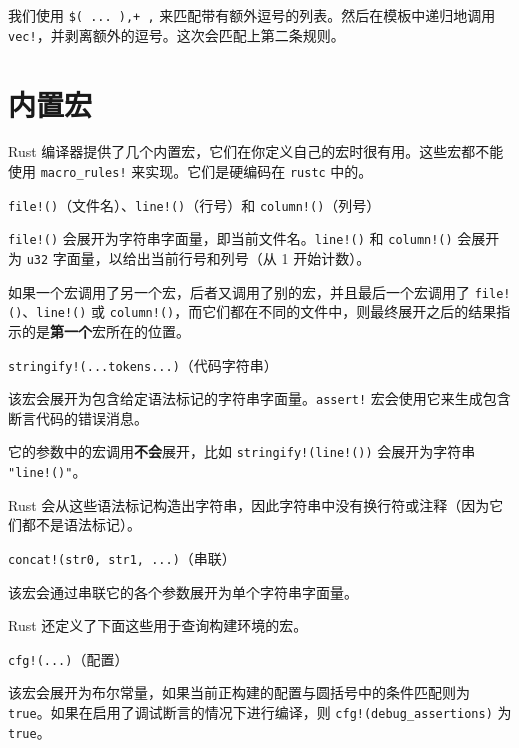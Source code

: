 我们使用 \texttt{\$( ... ),+ ,} 来匹配带有额外逗号的列表。然后在模板中递归地调用 \texttt{vec!}，并剥离额外的逗号。这次会匹配上第二条规则。

\section{内置宏}

Rust 编译器提供了几个内置宏，它们在你定义自己的宏时很有用。这些宏都不能使用 \texttt{macro\_rules!} 来实现。它们是硬编码在 \texttt{rustc} 中的。

\begin{myNote}
\texttt{file!()}（文件名）、\texttt{line!()}（行号）和 \texttt{column!()}（列号）
\end{myNote}

\texttt{file!()} 会展开为字符串字面量，即当前文件名。\texttt{line!()} 和 \texttt{column!()} 会展开为 \texttt{u32} 字面量，以给出当前行号和列号（从 1 开始计数）。

如果一个宏调用了另一个宏，后者又调用了别的宏，并且最后一个宏调用了 \texttt{file!()}、\texttt{line!()} 或 \texttt{column!()}，而它们都在不同的文件中，则最终展开之后的结果指示的是\textbf{第一个}宏所在的位置。

\begin{myNote}
\texttt{stringify!(...tokens...)}（代码字符串）
\end{myNote}

该宏会展开为包含给定语法标记的字符串字面量。\texttt{assert!} 宏会使用它来生成包含断言代码的错误消息。

它的参数中的宏调用\textbf{不会}展开，比如 \texttt{stringify!(line!())} 会展开为字符串 \texttt{"line!()"}。

Rust 会从这些语法标记构造出字符串，因此字符串中没有换行符或注释（因为它们都不是语法标记）。

\begin{mySidenote}
\texttt{concat!(str0, str1, ...)}（串联）
\end{mySidenote}

该宏会通过串联它的各个参数展开为单个字符串字面量。

Rust 还定义了下面这些用于查询构建环境的宏。

\begin{mySidenote}
\texttt{cfg!(...)}（配置）
\end{mySidenote}

该宏会展开为布尔常量，如果当前正构建的配置与圆括号中的条件匹配则为 \texttt{true}。如果在启用了调试断言的情况下进行编译，则 \texttt{cfg!(debug\_assertions)} 为 \texttt{true}。

